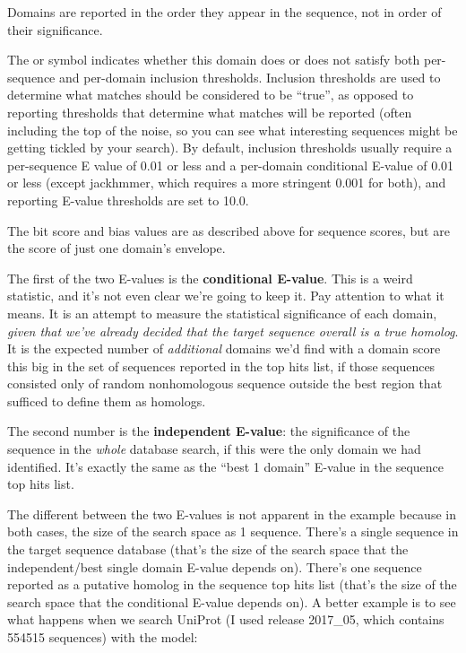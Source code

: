 Domains are reported in the order they appear in the sequence, not in
order of their significance.

The \ccode{!} or  symbol indicates whether this domain does
or does not satisfy both per-sequence and per-domain inclusion
thresholds. Inclusion thresholds are used to determine what matches
should be considered to be ``true'', as opposed to reporting
thresholds that determine what matches will be reported (often
including the top of the noise, so you can see what interesting
sequences might be getting tickled by your search). By default,
inclusion thresholds usually require a per-sequence E value of 0.01 or
less and a per-domain conditional E-value of 0.01 or less (except
jackhmmer, which requires a more stringent 0.001 for both), and
reporting E-value thresholds are set to 10.0.

The bit score and bias values are as described above for sequence
scores, but are the score of just one domain's envelope. 

The first of the two E-values is the \textbf{conditional
  E-value}. This is a weird statistic, and it's not even clear we're
going to keep it. Pay attention to what it means. It is an attempt to
measure the statistical significance of each domain, \emph{given that
  we've already decided that the target sequence overall is a true
  homolog}.  It is the expected number of \emph{additional} domains
we'd find with a domain score this big in the set of sequences
reported in the top hits list, if those sequences consisted only of
random nonhomologous sequence outside the best region that sufficed to
define them as homologs.

The second number is the \textbf{independent E-value}: the
significance of the sequence in the \emph{whole} database search, if
this were the only domain we had identified. It's exactly the same as
the ``best 1 domain'' E-value in the sequence top hits list.

The different between the two E-values is not apparent in the
 example because in both cases, the size of the
search space as 1 sequence. There's a single sequence in the target
sequence database (that's the size of the search space that the
independent/best single domain E-value depends on). There's one
sequence reported as a putative homolog in the sequence top hits list
(that's the size of the search space that the conditional E-value
depends on). A better example is to see what happens when we search
UniProt (I used release 2017\_05, which contains 554515 sequences) 
with the  model:

